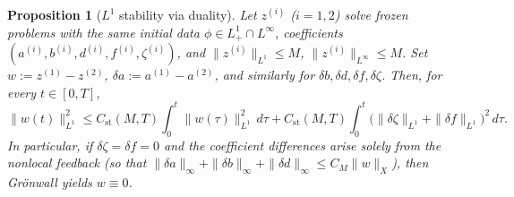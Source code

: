 \documentclass[pdflatex,sn-mathphys-num]{sn-jnl}%
\newtheorem{proposition}[theorem]{Proposition}
\begin{document}
\begin{proposition}[\(L^1\) stability via duality]\label{prop:appA_stability}
Let \(z^{(i)}\) (\(i=1,2\)) solve frozen problems with the \emph{same} initial data
\(\phi\in L^1_+\cap L^\infty\),
coefficients \((a^{(i)},b^{(i)},d^{(i)},f^{(i)},\zeta^{(i)})\), and
\(\|z^{(i)}\|_{L^1}\le M\), \(\|z^{(i)}\|_{L^\infty}\le M\). Set
\(w:=z^{(1)}-z^{(2)}\),
\(\delta a:=a^{(1)}-a^{(2)}\), and similarly for \(\delta b,\delta d,\delta f,\delta\zeta\).
Then, for every \(t\in[0,T]\),
\begin{equation}\label{eq:appA_stability}
\|w(t)\|_{L^1}^2
\le
C_{\mathrm{st}}(M,T)
\int_0^t\|w(\tau)\|_{L^1}^2\,d\tau
+
C_{\mathrm{st}}(M,T)
\int_0^t
\big(\|\delta\zeta\|_{L^1}+\|\delta f\|_{L^1}\big)^2\,d\tau.
\end{equation}
In particular, if \(\delta\zeta=\delta f=0\) and the coefficient differences arise
solely from the nonlocal feedback (so that
\(\|\delta a\|_\infty+\|\delta b\|_\infty+\|\delta d\|_\infty
\le C_M\|w\|_X\)), then Gr\"onwall yields \(w\equiv 0\).
\end{proposition}
\end{document}
